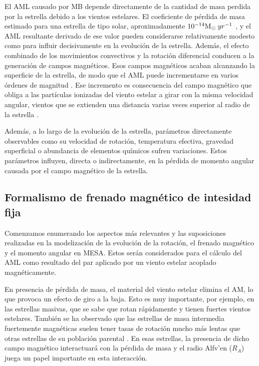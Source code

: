 El AML causado por MB depende directamente de la cantidad de masa perdida por la estrella debido a los vientos estelares. El coeficiente de pérdida de masa estimado para una estrella de tipo solar, aproximadamente $10^{-14}\mathrm{M}_\odot \; yr^{-1}$ \cite{Noerdlinger2008}, y el AML resultante derivado de ese valor pueden considerarse relativamente modesto como para influir decisivamente en la evolución de la estrella. Además, el efecto combinado de los movimientos convectivos y la rotación diferencial conducen a la generación de campos magnéticos. Esos campos magnéticos acaban alcanzando la superficie de la estrella, de modo que el AML puede incrementarse en varios órdenes de magnitud \cite{Langer2012}. Ese incremento es consecuencia del campo magnético que obliga a las partículas ionizadas del viento estelar a girar con la misma velocidad angular, vientos que se extienden una distancia varias veces superior al radio de la estrella \cite[ver][para más detalles]{UdDoula2002,Ud-Doula2007,Ud-Doula2008}.

Además, a lo largo de la evolución de la estrella, parámetros directamente observables como su velocidad de rotación, temperatura efectiva, gravedad superficial o abundancia de elementos químicos sufren variaciones. Estos parámetros influyen, directa o indirectamente, en la pérdida de momento angular causada por el campo magnético de la estrella.\par


\subsection{Formalismo de frenado magnético de intesidad fija} \label{mod_mb}
Comenzamos enumerando los aspectos más relevantes y las suposiciones realizadas en la modelización de la evolución de la rotación, el frenado magnético y el momento angular en MESA. Estos serán considerados para el cálculo del AML como resultado del par aplicado por un viento estelar acoplado magnéticamente.\par 

En presencia de pérdida de masa, el material del viento estelar elimina el AM, lo que provoca un efecto de giro a la baja. Esto es muy importante, por ejemplo, en las estrellas masivas, que se sabe que rotan rápidamente y tienen fuertes vientos estelares. También se ha observado que las estrellas de masa intermedia fuertemente magnéticas suelen tener tasas de rotación mucho más lentas que otras estrellas de su población parental \cite{Mathys2006}. En esas estrellas, la presencia de dicho campo magnético interactuará con la pérdida de masa y el radio Alfv'{e}n ($R_{A}$) juega un papel importante en esta interacción.\par


